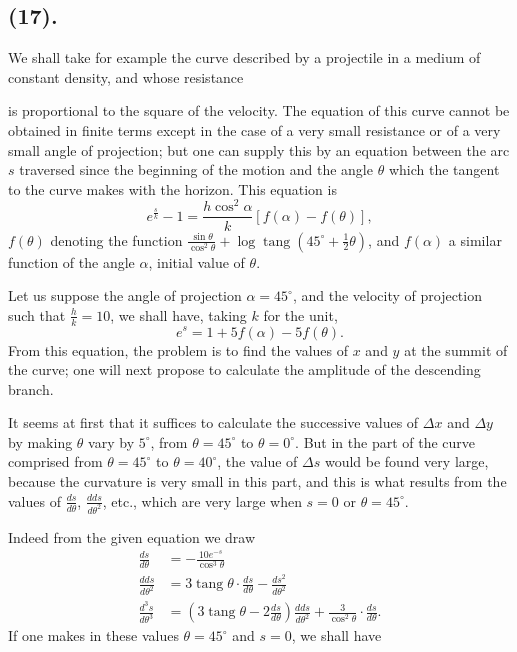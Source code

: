 \documentclass{article}
\begin{document}
\subsection*{(17).}

We shall take for example the curve described by a projectile in a medium of constant density, and whose resistance

is proportional to the square of the velocity. The equation of this curve cannot be obtained in finite terms except in the case of a very small resistance or of a very small angle of projection; but one can supply this by an equation between the arc $s$ traversed since the beginning of the motion and the angle $\theta$ which the tangent to the curve makes with the horizon. This equation is
\[ e^{\frac{s}{k}}-1=\frac{h\cos^{2}\alpha}{k}[f(\alpha)-f(\theta)], \]
$f(\theta)$ denoting the function $\frac{\sin\theta}{\cos^{2}\theta}+\log\operatorname{tang}(45^{\circ}+\frac{1}{2}\theta)$, and $f(\alpha)$ a similar function of the angle $\alpha$, initial value of $\theta$.

Let us suppose the angle of projection $\alpha=45^{\circ}$, and the velocity of projection such that $\frac{h}{k}=10$, we shall have, taking $k$ for the unit,
\[ e^{s}=1+5f(\alpha)-5f(\theta). \]
From this equation, the problem is to find the values of $x$ and $y$ at the summit of the curve; one will next propose to calculate the amplitude of the descending branch.

It seems at first that it suffices to calculate the successive values of $\Delta x$ and $\Delta y$ by making $\theta$ vary by $5^{\circ}$, from $\theta=45^{\circ}$ to $\theta=0^{\circ}$. But in the part of the curve comprised from $\theta=45^{\circ}$ to $\theta=40^{\circ}$, the value of $\Delta s$ would be found very large, because the curvature is very small in this part, and this is what results from the values of $\frac{ds}{d\theta}$, $\frac{dds}{d\theta^{2}}$, etc., which are very large when $s=0$ or $\theta=45^{\circ}$.

Indeed from the given equation we draw
\[ \begin{aligned} \frac{ds}{d\theta}&=-\frac{10e^{-s}}{\cos^{3}\theta}\\ \frac{dds}{d\theta^{2}}&=3\operatorname{tang}\theta\cdot\frac{ds}{d\theta}-\frac{ds^{2}}{d\theta^{2}}\\ \frac{d^{3}s}{d\theta^{3}}&=\left(3\operatorname{tang}\theta-2\frac{ds}{d\theta}\right)\frac{dds}{d\theta^{2}}+\frac{3}{\cos^{2}\theta}\cdot\frac{ds}{d\theta}. \end{aligned} \]
If one makes in these values $\theta=45^{\circ}$ and $s=0$, we shall have
\end{document}

